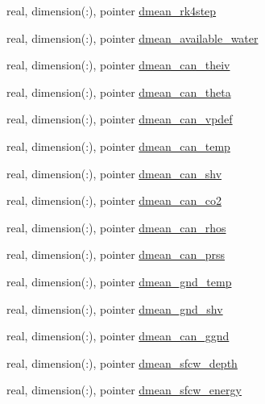 \begin{DoxyCompactItemize}
\item 
real, dimension(\+:), pointer \hyperlink{structed__state__vars_1_1edtype_aeee31dc73a4b28b303caab25d787d541}{dmean\+\_\+rk4step}
\item 
real, dimension(\+:), pointer \hyperlink{structed__state__vars_1_1edtype_a34c090fa2ac130eb9e2aa0433ef15f9c}{dmean\+\_\+available\+\_\+water}
\item 
real, dimension(\+:), pointer \hyperlink{structed__state__vars_1_1edtype_ab32c15821fab35ff9ff11a77e44764dc}{dmean\+\_\+can\+\_\+theiv}
\item 
real, dimension(\+:), pointer \hyperlink{structed__state__vars_1_1edtype_a732c201c4733a21a47d2560c2029b56f}{dmean\+\_\+can\+\_\+theta}
\item 
real, dimension(\+:), pointer \hyperlink{structed__state__vars_1_1edtype_a5a61b365ac9eaa6f5c04f3bb2d77eeb5}{dmean\+\_\+can\+\_\+vpdef}
\item 
real, dimension(\+:), pointer \hyperlink{structed__state__vars_1_1edtype_a2611e9a0ccceef7aa3e2a7b145eebb89}{dmean\+\_\+can\+\_\+temp}
\item 
real, dimension(\+:), pointer \hyperlink{structed__state__vars_1_1edtype_a23c4cf9dadf08a101bb2a132b3bb9e27}{dmean\+\_\+can\+\_\+shv}
\item 
real, dimension(\+:), pointer \hyperlink{structed__state__vars_1_1edtype_aea37cdeafd2514aef3583aa1c2b0b927}{dmean\+\_\+can\+\_\+co2}
\item 
real, dimension(\+:), pointer \hyperlink{structed__state__vars_1_1edtype_a876a80e8d17f17cdcc364672295d0de9}{dmean\+\_\+can\+\_\+rhos}
\item 
real, dimension(\+:), pointer \hyperlink{structed__state__vars_1_1edtype_a68ec75e79ec5ffdf8d604032831c792d}{dmean\+\_\+can\+\_\+prss}
\item 
real, dimension(\+:), pointer \hyperlink{structed__state__vars_1_1edtype_ad2d2ac220dc90294bfa5f6d57f0e6b78}{dmean\+\_\+gnd\+\_\+temp}
\item 
real, dimension(\+:), pointer \hyperlink{structed__state__vars_1_1edtype_aa921e0a1be979154bc2d58e403a48aea}{dmean\+\_\+gnd\+\_\+shv}
\item 
real, dimension(\+:), pointer \hyperlink{structed__state__vars_1_1edtype_a3f192faee654eb6203e2c3c2406a5bba}{dmean\+\_\+can\+\_\+ggnd}
\item 
real, dimension(\+:), pointer \hyperlink{structed__state__vars_1_1edtype_a4948a268d5f5aae7742ee5a5d5d3d68c}{dmean\+\_\+sfcw\+\_\+depth}
\item 
real, dimension(\+:), pointer \hyperlink{structed__state__vars_1_1edtype_a8dc16598864212da40f388bf7d5fa08e}{dmean\+\_\+sfcw\+\_\+energy}

\end{DoxyCompactItemize}
